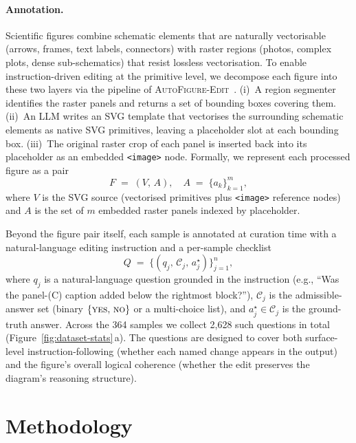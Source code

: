 \documentclass[11pt]{article}
\begin{document}
\paragraph{Annotation.}
Scientific figures combine schematic elements that are naturally
vectorisable (arrows, frames, text labels, connectors) with raster
regions (photos, complex plots, dense sub-schematics) that resist
lossless vectorisation.  To enable instruction-driven editing at
the primitive level, we decompose each figure into these two
layers via the pipeline of
\textsc{AutoFigure-Edit}~\citep{lin2026autofigure}.  (i)~A
region segmenter identifies the raster panels and returns a set
of bounding boxes covering them.  (ii)~An LLM writes an SVG
template that vectorises the surrounding schematic elements as
native SVG primitives, leaving a placeholder slot at each
bounding box.  (iii)~The original raster crop of each panel is
inserted back into its placeholder as an embedded
\texttt{<image>} node.  Formally, we represent each
processed figure as a pair
\begin{equation}
\label{eq:figure}
F \;=\; (V,\, A), \quad A \;=\; \{a_k\}_{k=1}^{m},
\end{equation}
where $V$ is the SVG source (vectorised primitives plus
\texttt{<image>} reference nodes) and $A$ is the set of $m$
embedded raster panels indexed by placeholder.

Beyond the figure pair itself, each sample is annotated at
curation time with a natural-language editing instruction and a
per-sample checklist
\begin{equation}
\label{eq:checklist-set}
Q \;=\; \big\{(q_j,\, \mathcal{C}_j,\, a^{\star}_j)\big\}_{j=1}^{n},
\end{equation}
where $q_j$ is a natural-language question grounded in the
instruction (e.g., ``Was the panel-(C) caption added below the
rightmost block?''), $\mathcal{C}_j$ is the admissible-answer set
(binary $\{\textsc{yes},\,\textsc{no}\}$ or a multi-choice list),
and $a^{\star}_j\!\in\!\mathcal{C}_j$ is the ground-truth answer.
Across the 364 samples we collect 2{,}628 such questions in total
(Figure~\ref{fig:dataset-stats}\,a).  The questions are designed
to cover both surface-level instruction-following (whether each
named change appears in the output) and the figure's overall
logical coherence (whether the edit preserves the diagram's
reasoning structure).

\section{Methodology}
\label{sec:method}
\end{document}
